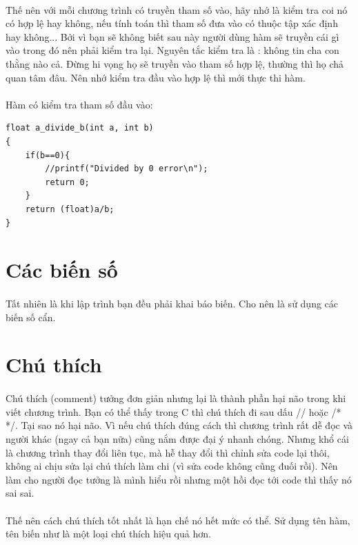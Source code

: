 \documentclass[12pt,a5paper]{book}
\begin{document}
\paragraph{}
Thế nên với mỗi chương trình có truyền tham số vào, hãy nhớ là kiểm tra coi nó có hợp lệ hay không, nếu tính toán thì tham số đưa vào có thuộc tập xác định hay không... Bởi vì bạn sẽ không biết sau này người dùng hàm sẽ truyền cái gì vào trong đó nên phải kiểm tra lại. Nguyên tắc kiểm tra là : không tin cha con thằng nào cả. Đừng hi vọng họ sẽ truyền vào tham số hợp lệ, thường thì họ chả quan tâm đâu. Nên nhớ kiểm tra đầu vào hợp lệ thì mới thực thi hàm.
\paragraph{}
Hàm có kiểm tra tham số đầu vào:
\begin{lstlisting}
float a_divide_b(int a, int b)
{
	if(b==0){
		//printf("Divided by 0 error\n");
		return 0;
	}
	return (float)a/b;
}
\end{lstlisting}

\section{Các biến số}
\paragraph{}
Tất nhiên là khi lập trình bạn đều phải khai báo biến. Cho nên là sử dụng các biến số cẩn.

\section{Chú thích}
\paragraph{}
Chú thích (comment) tưởng đơn giản nhưng lại là thành phần hại não trong khi viết chương trình. Bạn có thể thấy trong C thì chú thích đi sau dấu // hoặc /* */. Tại sao nó hại não. Vì nếu chú thích đúng cách thì chương trình rất dễ đọc và người khác (ngay cả bạn nữa) cũng nắm được đại ý nhanh chóng. Nhưng khổ cái là chương trình thay đổi liên tục, mà hễ thay đổi thì chỉnh sửa code lại thôi, không ai chịu sửa lại chú thích làm chi (vì sửa code không cũng đuối rồi). Nên làm cho người đọc tưởng là mình hiểu rồi nhưng một hồi đọc tới code thì thấy nó sai sai.
\paragraph{}
Thế nên cách chú thích tốt nhất là hạn chế nó hết mức có thể. Sử dụng tên hàm, tên biến như là một loại chú thích hiệu quả hơn.
\end{document}
